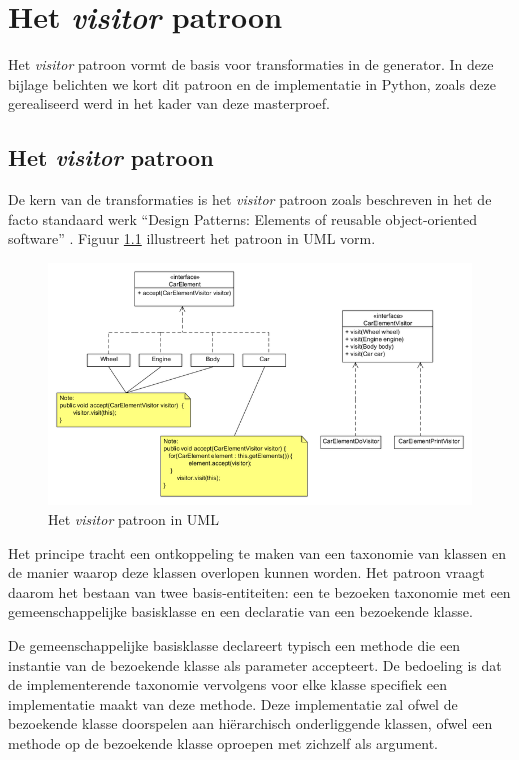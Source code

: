 
\chapter{Het \emph{visitor} patroon}
\label{appendix:visitor}

Het \emph{visitor} patroon vormt de basis voor transformaties in de generator.
In deze bijlage belichten we kort dit patroon en de implementatie in Python,
zoals deze gerealiseerd werd in het kader van deze masterproef.

\section{Het \emph{visitor} patroon}
\label{section:devel-visitor-pattern}

De kern van de transformaties is het \emph{visitor} patroon zoals beschreven in
het de facto standaard werk ``Design Patterns: Elements of reusable
object-oriented software'' \citep{gamma1994design}. Figuur \ref{fig:visitor}
illustreert het patroon in UML vorm.

\begin{figure}[ht]
  \centering
  \includegraphics[width=0.7\linewidth]{resources/visitor.png}
  \caption{Het \emph{visitor} patroon in UML}
  \label{fig:visitor}
\end{figure}

Het principe tracht een ontkoppeling te maken van een taxonomie van klassen en
de manier waarop deze klassen overlopen kunnen worden. Het patroon vraagt
daarom het bestaan van twee basis-entiteiten: een te bezoeken taxonomie met een
gemeenschappelijke basisklasse en een declaratie van een bezoekende klasse.

De gemeenschappelijke basisklasse declareert typisch een methode 
die een instantie van de bezoekende klasse als parameter accepteert. De
bedoeling is dat de implementerende taxonomie vervolgens voor elke klasse
specifiek een implementatie maakt van deze methode. Deze implementatie zal
ofwel de bezoekende klasse doorspelen aan hi\"erarchisch onderliggende klassen,
ofwel een  methode op de bezoekende klasse oproepen met zichzelf als
argument.


